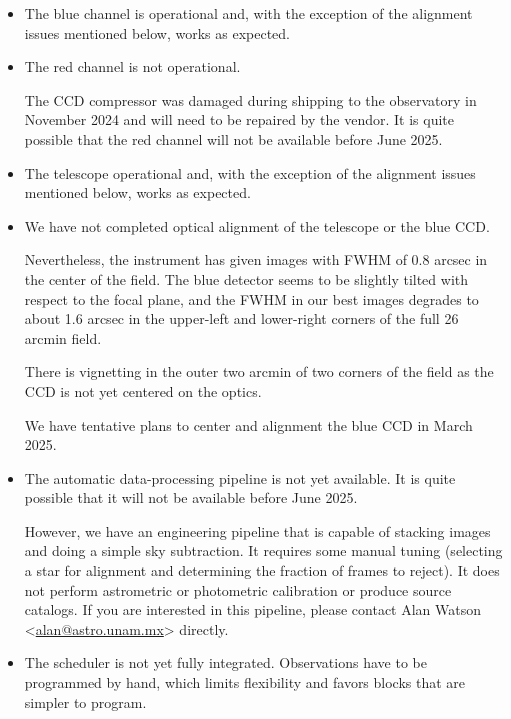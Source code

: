 \begin{itemize}

\item 
The blue channel is operational and, with the exception of the alignment issues mentioned below, works as expected. 

\item 
The red channel is not operational. 

The CCD compressor was damaged during shipping to the observatory in November 2024 and will need to be repaired by the vendor. It is quite possible that the red channel will not be available before June 2025.

\item 
The telescope operational and, with the exception of the alignment issues mentioned below, works as expected. 

\item
We have not completed optical alignment of the telescope or the blue CCD. 

Nevertheless, the instrument has given images with FWHM of 0.8 arcsec in the center of the field. The blue detector seems to be slightly tilted with respect to the focal plane, and the FWHM in our best images degrades to about 1.6 arcsec in the upper-left and lower-right corners of the full 26 arcmin field. 

There is vignetting in the outer two arcmin of two corners of the field as the CCD is not yet centered on the optics.

We have tentative plans to center and alignment the blue CCD in March 2025.

\item
The automatic data-processing pipeline is not yet available. It is quite possible that it will not be available before June 2025. 

However, we have an engineering pipeline that is capable of stacking images and doing a simple sky subtraction. It requires some manual tuning (selecting a star for alignment and determining the fraction of frames to reject). It does not perform astrometric or photometric calibration or produce source catalogs. If you are interested in this pipeline, please contact Alan Watson <\href{mailto:alan@astro.unam.mx}{alan@astro.unam.mx}> directly.

\item
The scheduler is not yet fully integrated. Observations have to be programmed by hand, which limits flexibility and favors blocks that are simpler to program.

\end{itemize}
